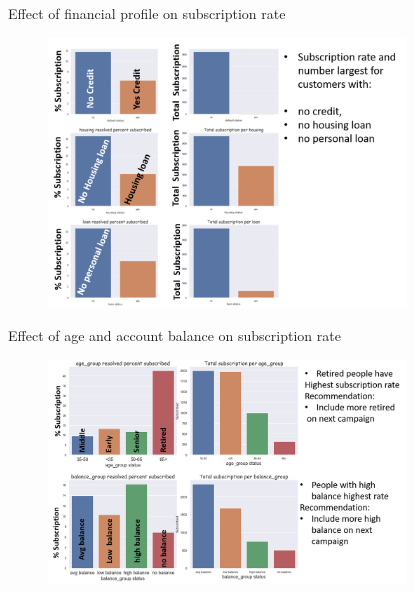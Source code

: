\begin{frame}{Effect of financial profile on subscription rate}


	\begin{figure}
		
		\includegraphics[width=9.50cm]{figures/fig_financial_rate.png}
	\end{figure}
\end{frame}

\begin{frame}{Effect of age and account balance on subscription rate}


	\begin{figure}
		
		\includegraphics[width=9.50cm]{figures/fig_age_balance_rate.png}
	\end{figure}
\end{frame}

